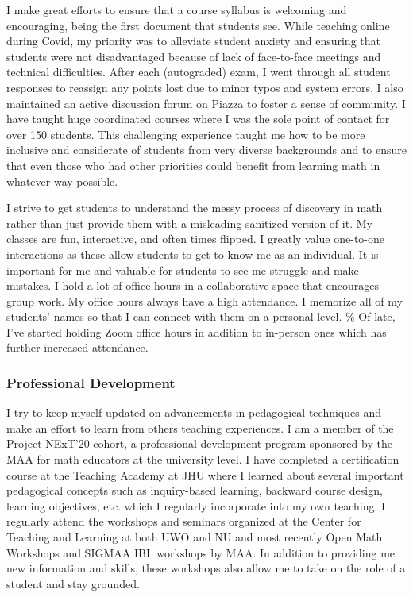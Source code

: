 \documentclass[
]{report}
\begin{document}
I make great efforts to ensure that a course syllabus is welcoming and encouraging, being the first document that students see.
While teaching online during Covid, my priority was to alleviate student anxiety and ensuring that students were not disadvantaged because of lack of face-to-face meetings and technical difficulties.
After each (autograded) exam, I went through all student responses to reassign any points lost due to minor typos and system errors.
I also maintained an active discussion forum on Piazza to foster a sense of community.
I have taught huge coordinated courses where I was the sole point of contact for over 150 students.
This challenging experience taught me how to be more inclusive and considerate of students from very diverse backgrounds and to ensure that even those who had other priorities could benefit from learning math in whatever way possible.

I strive to get students to understand the messy process of discovery in math rather than just provide them with a misleading sanitized version of it.
My classes are fun, interactive, and often times flipped.
I greatly value one-to-one interactions as these allow students to get to know me as an individual.
It is important for me and valuable for students to see me struggle and make mistakes.
I hold a lot of office hours in a collaborative space that encourages group work.
My office hours always have a high attendance.
I memorize all of my students' names so that I can connect with them on a personal level.
\% Of late, I've started holding Zoom office hours in addition to in-person ones which has further increased attendance.

\hypertarget{professional-development}{%
\subsubsection*{Professional Development}\label{professional-development}}

I try to keep myself updated on advancements in pedagogical techniques and make an effort to learn from others teaching experiences.
I am a member of the Project NExT'20 cohort, a professional development program sponsored by the MAA for math educators at the university level.
I have completed a certification course at the Teaching Academy at JHU where I learned about several important pedagogical concepts such as inquiry-based learning, backward course design, learning objectives, etc. which I regularly incorporate into my own teaching.
I regularly attend the workshops and seminars organized at the Center for Teaching and Learning at both UWO and NU and most recently Open Math Workshops and SIGMAA IBL workshops by MAA.
In addition to providing me new information and skills, these workshops also allow me to take on the role of a student and stay grounded.
\end{document}
